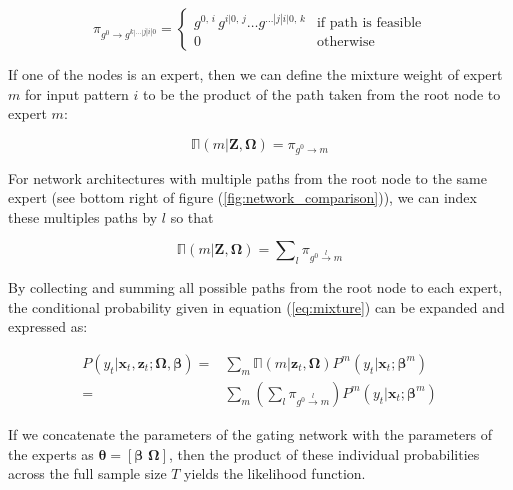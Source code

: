 \documentclass[12pt]{article}
\newcommand{\gateprod}[2]{\pi_{#1 \longrightarrow #2}}
\newcommand{\sumgateprod}[3]{\pi_{#1 \overset{#3}{\longrightarrow} #2}}
\newcommand{\shortsum}[1]{\sum \nolimits_{#1}}
\newcommand{\expmixwt}[0]{\mathbb{\Pi}}
\begin{document}
\begin{equation} \label{eq:gpath}
  \gateprod{g^{0}}{g^{k|\ldots|j|i|0}} =
    \begin{cases} 
       g^{0, \, i} \, g^{i|0, \, j} \ldots g^{\dots|j|i|0, \, k} & \textrm{if path is feasible} \\
       0 & \textrm{otherwise}
    \end{cases}
\end{equation}

If one of the nodes is an expert, then we can define the mixture weight
of expert $m$ for input pattern $i$ to be the product of the path taken
from the root node to expert $m$:

\begin{equation} \label{eq:gpath2}
  \expmixwt(m | \boldsymbol{Z}, \boldsymbol{\Omega}) = \gateprod{g^{0}}{m}
\end{equation}

For network architectures with multiple paths from the root node to
the same expert (see bottom right of figure (\ref{fig:network_comparison})),
we can index these multiples paths by $l$ so that

\begin{equation} \label{eq:pathsums}
  \expmixwt(m | \boldsymbol{Z}, \boldsymbol{\Omega}) = \shortsum{l} \sumgateprod{g^{0}}{m}{l} 
\end{equation}


By collecting and summing all possible paths from the root node to each
expert, the conditional probability given in equation (\ref{eq:mixture}) can be
expanded and expressed as:

\begin{equation} \label{eq:contribution}
  \begin{split}
    P(y_{t}| \boldsymbol{x}_{t}, \boldsymbol{z}_{t}; \boldsymbol{\Omega}, \boldsymbol{\beta}) =& \sum_{m} \expmixwt(m | \boldsymbol{z}_{t}, \boldsymbol{\Omega}) P^{m}(y_{t}| \boldsymbol{x}_{t}; \boldsymbol{\beta}^{m}) \\ 
      =& \sum_{m} \left( \shortsum{l} \sumgateprod{g^{0}}{m}{l} \right)  P^{m}(y_{t}| \boldsymbol{x}_{t}; \boldsymbol{\beta}^{m})
  \end{split}
\end{equation}

If we concatenate the parameters of the gating network with the parameters of
the experts as $\boldsymbol{\theta} = [\boldsymbol{\beta} \,\, \boldsymbol{\Omega}]$,
then the product of these individual probabilities across the full sample size $T$ yields
the likelihood function. 
\end{document}
